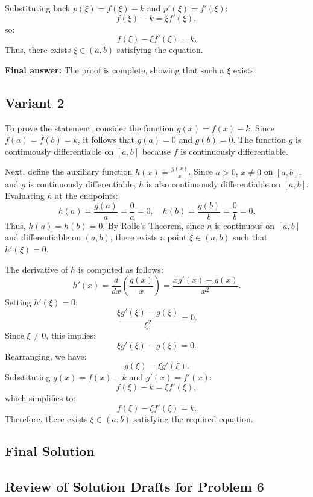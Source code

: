 \documentclass[12pt,a4paper]{article}
\theoremstyle{definition}
\begin{document}
    Substituting back $p(\xi) = f(\xi) - k$ and $p'(\xi) = f'(\xi)$:
    \[
        f(\xi) - k = \xi f'(\xi),
    \]
    so:
    \[
        f(\xi) - \xi f'(\xi) = k.
    \]
    Thus, there exists $\xi \in (a, b)$ satisfying the equation.

    \textbf{Final answer:} The proof is complete, showing that such a $\xi$ exists.
\subsection{Variant 2}
    To prove the statement, consider the function $g(x) = f(x) - k$. Since $f(a) = f(b) = k$, it follows that $g(a) = 0$ and $g(b) = 0$. The function $g$ is continuously differentiable on $[a, b]$ because $f$ is continuously differentiable.

    Next, define the auxiliary function $h(x) = \frac{g(x)}{x}$. Since $a > 0$, $x \neq 0$ on $[a, b]$, and $g$ is continuously differentiable, $h$ is also continuously differentiable on $[a, b]$. Evaluating $h$ at the endpoints:
    \[
        h(a) = \frac{g(a)}{a} = \frac{0}{a} = 0, \quad h(b) = \frac{g(b)}{b} = \frac{0}{b} = 0.
    \]
    Thus, $h(a) = h(b) = 0$. By Rolle's Theorem, since $h$ is continuous on $[a, b]$ and differentiable on $(a, b)$, there exists a point $\xi \in (a, b)$ such that $h'(\xi) = 0$.

    The derivative of $h$ is computed as follows:
    \[
        h'(x) = \frac{d}{dx} \left( \frac{g(x)}{x} \right) = \frac{x g'(x) - g(x)}{x^2}.
    \]
    Setting $h'(\xi) = 0$:
    \[
        \frac{\xi g'(\xi) - g(\xi)}{\xi^2} = 0.
    \]
    Since $\xi \neq 0$, this implies:
    \[
        \xi g'(\xi) - g(\xi) = 0.
    \]
    Rearranging, we have:
    \[
        g(\xi) = \xi g'(\xi).
    \]
    Substituting $g(x) = f(x) - k$ and $g'(x) = f'(x)$:
    \[
        f(\xi) - k = \xi f'(\xi),
    \]
    which simplifies to:
    \[
        f(\xi) - \xi f'(\xi) = k.
    \]
    Therefore, there exists $\xi \in (a, b)$ satisfying the required equation.

\subsection{Final Solution}
    \subsection*{Review of Solution Drafts for Problem 6}
\end{document}
